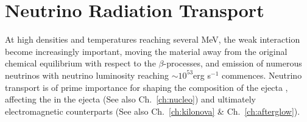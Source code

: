 


\section{Neutrino Radiation Transport}\label{sec:nr_methods:neut}


At high densities and temperatures reaching several MeV, the weak interaction become increasingly important,
moving the material away from the original chemical equilibrium with respect to the 
$\beta$-processes, and emission of numerous neutrinos with neutrino luminosity 
reaching $\sim10^{53}$erg s$^{-1}$ commences. 
%
Neutrino transport is of prime importance for shaping the composition of the ejecta
\citep{Wanajo:2014wha,Sekiguchi:2015dma,Foucart:2015vpa,Foucart:2015gaa},
affecting the \nuc{} in the ejecta \citep{Wanajo:2014wha,Goriely:2015fqa} 
(See also Ch.~\ref{ch:nucleo})
and ultimately electromagnetic counterparts \citep{Metzger:2014ila,Lippuner:2015gwa} (See also Ch.~\ref{ch:kilonova} \& Ch.~\ref{ch:afterglow}).

